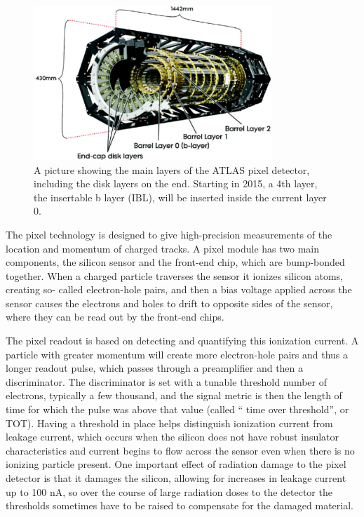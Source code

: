 \begin{figure}
	\includegraphics[width=0.8\textwidth]{ATLASDetector/images/pixel_detector.pdf} 
	\caption{A picture showing the main layers of the ATLAS pixel detector, including the disk layers on the end.  Starting in 2015, a 4th layer, the insertable b layer (IBL), will be inserted inside the current layer 0. 	\label{fig:inner_detector} }
\end{figure}

The pixel technology is designed to give high-precision measurements of the location and momentum of charged tracks.  
A pixel module has two main components, the silicon sensor and the front-end chip, which are 
bump-bonded together.  When a charged particle traverses the sensor it ionizes silicon atoms, creating so-
called electron-hole pairs, and then a bias voltage applied across the sensor causes the electrons and holes 
to drift to opposite sides of the sensor, where they can be read out by the front-end chips.  

The pixel readout is based on detecting and quantifying this ionization current.  A particle with greater momentum will create 
more electron-hole pairs and thus a longer readout pulse, which passes through a preamplifier and then a 
discriminator.  The discriminator is set with a tunable threshold number of electrons, typically a few thousand, and 
the signal metric is then the length of time for which the pulse was above that value (called ``
time over threshold'', or TOT).  Having a threshold in place helps distinguish ionization current from leakage current, 
which occurs when the silicon does not have robust insulator characteristics and current begins to flow across the sensor even 
when there is no ionizing particle present.  One important effect of radiation damage to the pixel detector is that 
it damages the silicon, allowing for increases in leakage current up to 100 nA, so over the course 
of large radiation doses to the detector the thresholds sometimes have to be raised to compensate for the damaged material.  


